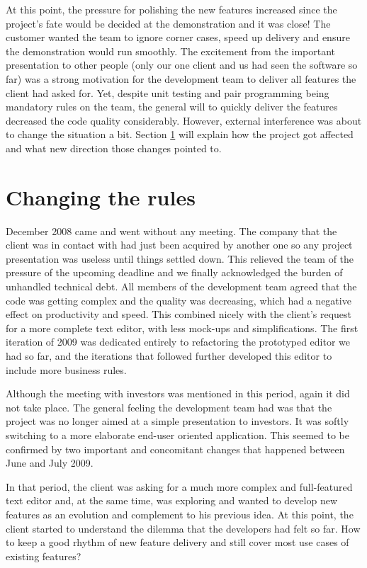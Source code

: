\documentclass[lnbip]{svmultln}
\begin{document}
At this point, the pressure for polishing the new features increased
since the project's fate would be decided at the demonstration and it
was close! The customer wanted the team to ignore corner cases, speed
up delivery and ensure the demonstration would run smoothly. The
excitement from the important presentation to other people (only our
one client and us had seen the software so far) was a strong
motivation for the development team to deliver all features the client
had asked for. Yet, despite unit testing and pair programming being
mandatory rules on the team, the general will to quickly deliver the
features decreased the code quality considerably. However, external
interference was about to change the situation a bit. Section
\ref{sec:changes} will explain how the project got affected and what
new direction those changes pointed to.

\section{Changing the rules}
\label{sec:changes}

December 2008 came and went without any meeting. The company that the
client was in contact with had just been acquired by another one so
any project presentation was useless until things settled down. This
relieved the team of the pressure of the upcoming deadline and we
finally acknowledged the burden of unhandled technical debt. All
members of the development team agreed that the code was getting
complex and the quality was decreasing, which had a negative effect on
productivity and speed. This combined nicely with the client's request
for a more complete text editor, with less mock-ups and
simplifications. The first iteration of 2009 was dedicated entirely to
refactoring the prototyped editor we had so far, and the iterations
that followed further developed this editor to include more business
rules.

Although the meeting with investors was mentioned in this period,
again it did not take place. The general feeling the development team
had was that the project was no longer aimed at a simple presentation
to investors. It was softly switching to a more elaborate end-user
oriented application. This seemed to be confirmed by two important and
concomitant changes that happened between June and July 2009.

In that period, the client was asking for a much more complex and
full-featured text editor and, at the same time, was exploring and
wanted to develop new features as an evolution and complement to his
previous idea. At this point, the client started to understand the
dilemma that the developers had felt so far.  How to keep a good
rhythm of new feature delivery and still cover most use cases of
existing features?
\end{document}
